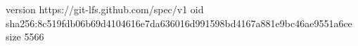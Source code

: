 version https://git-lfs.github.com/spec/v1
oid sha256:8c519fdb06b69d4104616e7da636016d991598bd4167a881e9bc46ae9551a6ce
size 5566

